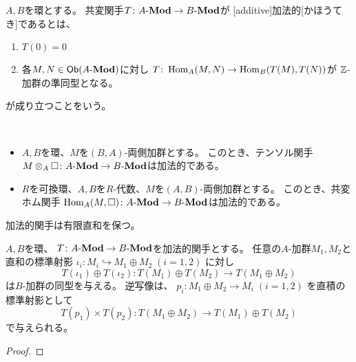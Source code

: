 \documentclass[report]{jlreq}
\begin{document}
\begin{definition}[加法的関手]
    $A, B$を環とする。
    共変関手$T \colon A\text{-}\mathbf{Mod} \to B\text{-}\mathbf{Mod}$が
    [additive]{加法的}[かほうてき]であるとは、
    \begin{enumerate}
        \item $T(0) = 0$
        \item 各$M, N \in \operatorname{\mathsf{Ob}}(A\text{-}\mathbf{Mod})$に対し
            $T \colon \operatorname{Hom}_A(M, N) \to \operatorname{Hom}_B(T(M), T(N))$が
            $\mathbb{Z}$-加群の準同型となる。
    \end{enumerate}
    が成り立つことをいう。
\end{definition}

\begin{example}[加法的関手の例]
    ~
    \begin{itemize}
        \item $A, B$を環、$M$を$(B, A)$-両側加群とする。
            このとき、テンソル関手
            $M \otimes_A \Box \colon A\text{-}\mathbf{Mod} \to B\text{-}\mathbf{Mod}$は加法的である。
        \item $R$を可換環、$A, B$を$R$-代数、$M$を$(A, B)$-両側加群とする。
            このとき、共変ホム関手
            $\operatorname{Hom}_A(M, \Box) \colon A\text{-}\mathbf{Mod} \to B\text{-}\mathbf{Mod}$は加法的である。
    \end{itemize}
\end{example}

加法的関手は有限直和を保つ。

\begin{theorem}[加法的関手は有限直和を保つ]
    $A, B$を環、
    $T \colon A\text{-}\mathbf{Mod} \to B\text{-}\mathbf{Mod}$を加法的関手とする。
    任意の$A$-加群$M_1, M_2$と
    直和の標準射影
    $\iota_i \colon M_i \hookrightarrow M_1 \oplus M_2 \; (i = 1, 2)$
    に対し
    \begin{equation}
        T(\iota_1) \oplus T(\iota_2) \colon
            T(M_1) \oplus T(M_2) \to T(M_1 \oplus M_2)
    \end{equation}
    は$B$-加群の同型を与える。
    逆写像は、
    $p_i \colon M_1 \oplus M_2 \to M_i \; (i = 1, 2)$
    を直積の標準射影として
    \begin{equation}
        T(p_1) \times T(p_2) \colon
            T(M_1 \oplus M_2) \to T(M_1) \oplus T(M_2)
    \end{equation}
    で与えられる。
\end{theorem}

\begin{proof}
    \TODO{}
\end{proof}
\end{document}
